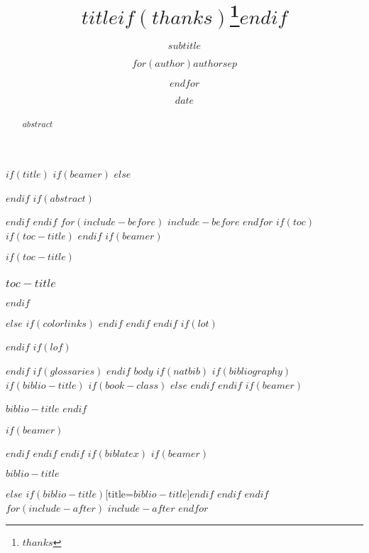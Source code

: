 \documentclass[
    $if(fontsize)$
        $fontsize$,
    $endif$
    $if(lang)$
        $babel-lang$,
    $endif$
    $if(papersize)$
        $papersize$paper,
    $endif$
    $if(beamer)$
        ignorenonframetext,
        $if(handout)$
            handout,
        $endif$
        $if(aspectratio)$
            aspectratio=$aspectratio$,
        $endif$
    $endif$
    $for(classoption)$
        $classoption$$sep$,
    $endfor$
    ]{$documentclass$}
\title{$title$$if(thanks)$\thanks{$thanks$}$endif$}
\subtitle{$subtitle$}
\author{$for(author)$$author$$sep$ \and $endfor$}
\date{$date$}
\institute{$for(institute)$$institute$$sep$ \and $endfor$}
\begin{document}
$if(title)$
    $if(beamer)$
        \frame{\titlepage}
    $else$
            \maketitle
    $endif$
    $if(abstract)$
        \begin{abstract}
            $abstract$
        \end{abstract}
    $endif$
$endif$
$for(include-before)$
    $include-before$
$endfor$
$if(toc)$
    $if(toc-title)$
        \renewcommand*\contentsname{$toc-title$}
    $endif$
    $if(beamer)$
        \begin{frame}
            $if(toc-title)$
                \frametitle{$toc-title$}
            $endif$
            \tableofcontents[hideallsubsections]
        \end{frame}
    $else$
        {
        $if(colorlinks)$
            \hypersetup{linkcolor=$if(toccolor)$$toccolor$$else$Maroon$endif$}
        $endif$
        \setcounter{tocdepth}{$toc-depth$}
        \tableofcontents
        }
    $endif$
$endif$
$if(lot)$
    \listoftables
$endif$
$if(lof)$
    \listoffigures
$endif$
$if(glossaries)$
    \printnoidxglossaries
$endif$
\clearpage
$body$
$if(natbib)$
    $if(bibliography)$
        $if(biblio-title)$
            $if(book-class)$
                \renewcommand\bibname{$biblio-title$}
            $else$
                \renewcommand\refname{$biblio-title$}
            $endif$
        $endif$
        $if(beamer)$
            \begin{frame}[allowframebreaks]{$biblio-title$}
                \bibliographytrue
        $endif$
        
        $if(beamer)$
            \end{frame}
        $endif$
    $endif$
$endif$
$if(biblatex)$
    $if(beamer)$
        \begin{frame}[allowframebreaks]{$biblio-title$}
            \bibliographytrue
            \printbibliography[heading=none]
        \end{frame}
    $else$
        \printbibliography$if(biblio-title)$[title=$biblio-title$]$endif$
    $endif$
$endif$
$for(include-after)$
    $include-after$
$endfor$
\end{document}
